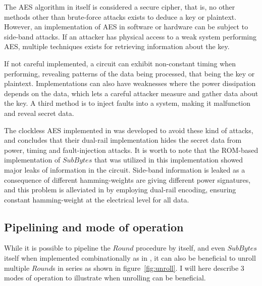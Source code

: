 The AES algorithm in itself is considered a secure cipher, that is, no
other methods other than brute-force attacks exists to deduce a key or
plaintext. However, an implementation of AES in software or hardware
can be subject to side-band attacks. If an attacker has physical
access to a weak system performing AES, multiple techniques exists for
retrieving information about the key.

If not careful implemented, a circuit can exhibit non-constant timing
when performing, revealing patterns of the data being processed, that
being the key or plaintext. Implementations can also have weaknesses
where the power dissipation depends on the data, which lets a careful
attacker measure and gather data about the key. A third method is to
inject faults into a system, making it malfunction and reveal secret
data.

The clockless AES implemented in \cite{claes} was developed to avoid
these kind of attacks, and concludes that their dual-rail
implementation hides the secret data from power, timing and
fault-injection attacks. It is worth to note that the ROM-based
implementation of $SubBytes$ that was utilized in this implementation
showed major leaks of information in the circuit. Side-band
information is leaked as a consequence of different hamming-weights
are giving different power signatures, and this problem is alleviated
in \cite{claes} by employing dual-rail encoding, ensuring constant
hamming-weight at the electrical level for all data.

\subsection{Pipelining and mode of operation}

While it is possible to pipeline the $Round$ procedure by itself, and
even $SubBytes$ itself when implemented combinationally as in
\cite{csbox}, it can also be beneficial to unroll multiple $Round$s in
series as shown in figure~\ref{fig:unroll}. I will here describe 3
modes of operation to illustrate when unrolling can be beneficial.


